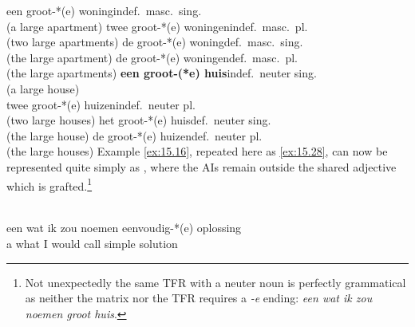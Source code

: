\documentclass[output=paper]{langsci/langscibook}
\begin{document}
\begin{refcontext}
\ea\label{ex:15.27}
    \ea een groot-*(e) woning\hfill indef.\ masc.\ sing.\\
        (a large apartment)
    \ex twee groot-*(e) woningen\hfill indef.\ masc.\ pl.\\
        (two large apartments)
    \ex de groot-*(e) woning\hfill def.\ masc.\ sing.\\
        (the large apartment)
    \ex de groot-*(e) woningen\hfill def.\ masc.\ pl.\\
        (the large apartments)
    \ex \textbf{een groot-(*e) huis}\hfill indef.\ neuter sing.\\
        (a large house)\\
    \ex twee groot-*(e) huizen\hfill indef.\ neuter pl.\\
        (two large houses)
    \ex het groot-*(e) huis\hfill def.\ neuter sing.\\
        (the large house)
    \ex de groot-*(e) huizen\hfill def.\ neuter pl.\\
        (the large houses)
    \z
\z
Example \eqref{ex:15.16}, repeated here as \eqref{ex:15.28}, can now be represented quite simply as
, where the AIs remain outside the shared adjective which is
grafted.\footnote{Not unexpectedly the same \gls{TFR} with a neuter noun is
    perfectly grammatical as neither the matrix nor the \gls{TFR} requires a
\emph{-e} ending: \emph{een wat ik zou noemen groot huis}.}

\ea\label{ex:15.28}\\
    \gll    een wat    ik zou     noemen eenvoudig-*(e) oplossing  \\
            a      what I  would call         simple               solution\\
    \glt
\z

%



\end{refcontext}
\end{document}
